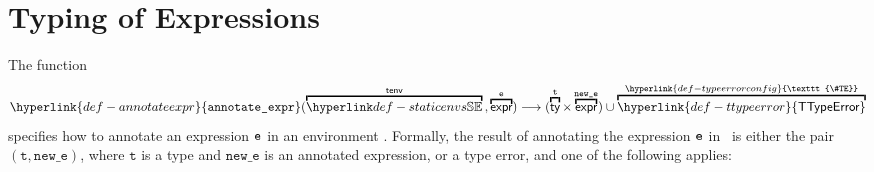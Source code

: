 \documentclass{book}
\newcommand\TTypeError[0]{\hyperlink{def-ttypeerror}{\textsf{TTypeError}}}
\newcommand\TypeErrorConfig[0]{\hyperlink{def-typeerrorconfig}{\texttt{\#TE}}}
\newcommand\annotateexpr[1]{\hyperlink{def-annotateexpr}{\texttt{annotate\_expr}}(#1)}
\newcommand\vt[0]{\texttt{t}}
\newcommand\newe[0]{\texttt{new\_e}}
\begin{document}

\chapter{Typing of Expressions}
\hypertarget{def-annotateexpr}{}
The function
\[
  \annotateexpr{\overname{\staticenvs}{\tenv} \aslsep \overname{\expr}{\ve}}
  \aslto (\overname{\ty}{\vt} \times \overname{\expr}{\newe})
  \cup \overname{\TTypeError}{\TypeErrorConfig}
\]
specifies how to annotate an expression $\texttt{e}$ in
an environment \tenv.  Formally, the result of annotating the expression
$\texttt{e}$ in \tenv\ is either the pair $(\vt, \newe)$, where $\vt$ is a type and
$\newe$ is an annotated expression, or a type error, and one of the following applies:
\end{document}
